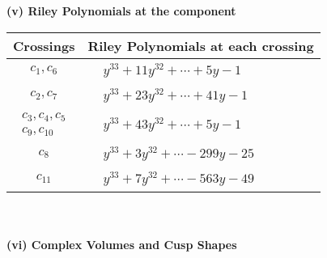 \documentclass[1p]{elsarticle_modified}
\theoremstyle{definition}
\begin{document}
\newpage\renewcommand{\arraystretch}{1}
\flushleft \textbf{(v) Riley Polynomials at the component}\newline \\
\begin{tabular}{m{50pt}|m{274pt}}
Crossings & \hspace{64pt}Riley Polynomials at each crossing \\
\hline $$\begin{aligned}c_{1},c_{6}\end{aligned}$$&$\begin{aligned}
&y^{33}+11 y^{32}+\cdots+5 y-1
\end{aligned}$\\
\hline $$\begin{aligned}c_{2},c_{7}\end{aligned}$$&$\begin{aligned}
&y^{33}+23 y^{32}+\cdots+41 y-1
\end{aligned}$\\
\hline $$\begin{aligned}c_{3},c_{4},c_{5}\\c_{9},c_{10}\end{aligned}$$&$\begin{aligned}
&y^{33}+43 y^{32}+\cdots+5 y-1
\end{aligned}$\\
\hline $$\begin{aligned}c_{8}\end{aligned}$$&$\begin{aligned}
&y^{33}+3 y^{32}+\cdots-299 y-25
\end{aligned}$\\
\hline $$\begin{aligned}c_{11}\end{aligned}$$&$\begin{aligned}
&y^{33}+7 y^{32}+\cdots-563 y-49
\end{aligned}$\\
\hline
\end{tabular}\\~\\
\newpage\flushleft \textbf{(vi) Complex Volumes and Cusp Shapes}
\end{document}
